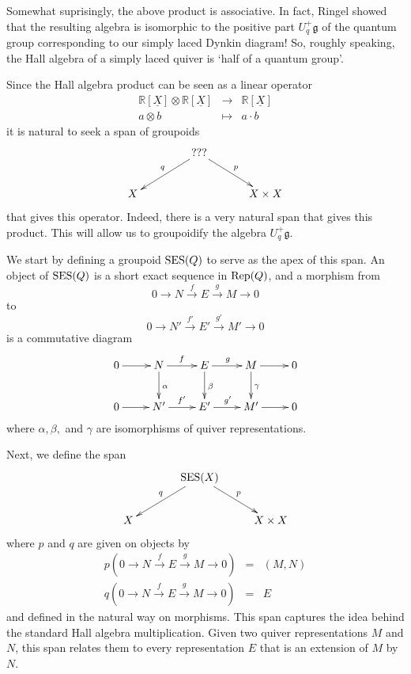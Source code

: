 \documentclass{article}
\newcommand{\Rep}{{\rm Rep}}
\newcommand{\SES}{{\rm SES}}
\renewcommand{\to}{\rightarrow}
\newcommand{\tensor}{\otimes}
\newcommand{\g}{{\mathfrak g}}
\newcommand{\R}{{\mathbb R}}
\renewcommand{\u}[1]{\underline{#1}}
\begin{document}
Somewhat suprisingly, the above product is associative.  In fact,
Ringel \cite{Ringel} showed that the resulting algebra is isomorphic
to the positive part $U_q^+ \g$ of the quantum group corresponding to
our simply laced Dynkin diagram!  So, roughly speaking, the Hall algebra
of a simply laced quiver is `half of a quantum group'.

Since the Hall algebra product can be seen as a linear operator
\[  
\begin{array}{ccc} 
 \R[\u{X}] \tensor \R[\u{X}] &\to& \R[\u{X}] \\
         a \tensor b       & \mapsto & a\cdot b 
\end{array}
\]
it is natural to seek a span of groupoids 
\[
\xymatrix@!C{
& {\rm ???}\ar[dl]_{q} \ar[dr]^{p} & \\
X & & X\times X
}
\]
that gives this operator.  Indeed, there is a very natural span that
gives this product.  This will allow us to groupoidify the algebra
$U_q^+ \g$.  

We start by defining a groupoid $\SES(Q)$ to serve as the apex of this
span.  An object of $\SES(Q)$ is a short exact sequence in $\Rep(Q)$,
and a morphism from
\[ 0\to N \stackrel{f}{\to} E \stackrel{g}{\to} M\to 0 \]
to
\[ 0\to N' \stackrel{f'}{\to} E' \stackrel{g'}{\to} M'\to 0 \]
is a commutative diagram
\[
\xymatrix{
0 \ar[r] & 
N \ar[r]^{f} \ar[d]^{\alpha} & 
E \ar[r]^{g} \ar[d]^{\beta} & 
M \ar[r] \ar[d]^{\gamma} & 0 \\
0 \ar[r] & N' \ar[r]^{f'} & E' \ar[r]^{g'} & M' \ar[r] & 0 \\
}
\]
where $\alpha,\beta,$ and $\gamma$ are isomorphisms of
quiver representations.

Next, we define the span
\[
\xymatrix@!C{
& \SES(X)\ar[dl]_{q} \ar[dr]^{p} & \\
X & & X\times X
}
\]
where $p$ and $q$ are given on objects by
\[
\begin{array}{ccl}
  p(0\to N \stackrel{f}{\to} E \stackrel{g}{\to} M\to 0) &=& (M,N) \\
  q(0\to N \stackrel{f}{\to} E \stackrel{g}{\to} M\to 0) &=& E 
\end{array}
\]
and defined in the natural way on morphisms.  This span captures the
idea behind the standard Hall algebra multiplication.  Given two
quiver representations $M$ and $N$, this span relates them to every 
representation $E$ that is an extension of $M$ by $N$.
\end{document}
